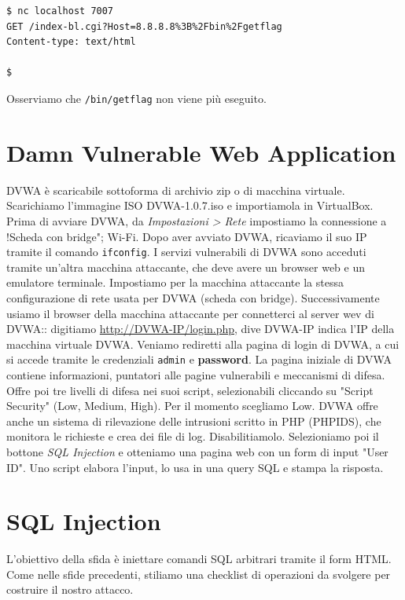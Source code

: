 \begin{mdframed}[backgroundcolor=white!20,shadow=false]
\begin{lstlisting}
$ nc localhost 7007
GET /index-bl.cgi?Host=8.8.8.8%3B%2Fbin%2Fgetflag
Content-type: text/html

$
\end{lstlisting}
\end{mdframed}
Osserviamo che \texttt{/bin/getflag} non viene più eseguito.


\section{Damn Vulnerable Web Application}
DVWA è scaricabile sottoforma di archivio zip o di macchina virtuale. Scarichiamo l'immagine ISO DVWA-1.0.7.iso e importiamola in VirtualBox. Prima di avviare DVWA, da \textit{Impostazioni > Rete} impostiamo la connessione a !Scheda con bridge"; Wi-Fi. Dopo aver avviato DVWA, ricaviamo il suo IP tramite il comando \texttt{ifconfig}. I servizi vulnerabili di DVWA sono acceduti tramite un'altra macchina attaccante, che deve avere un browser web e un emulatore terminale. Impostiamo per la macchina attaccante la stessa configurazione di rete usata per DVWA (scheda con bridge). Successivamente usiamo il browser della macchina attaccante per connetterci al server wev di DVWA:: digitiamo \href{http://DVWA-IP/login.php}{http://DVWA-IP/login.php}, dive DVWA-IP indica l'IP della macchina virtuale DVWA. Veniamo rediretti alla pagina di login di DVWA, a cui si accede tramite le credenziali \texttt{admin} e \textbf{password}. La pagina iniziale di DVWA contiene informazioni, puntatori alle pagine vulnerabili e meccanismi di difesa. Offre poi tre livelli di difesa nei suoi script, selezionabili cliccando su "Script Security" (Low, Medium, High). Per il momento scegliamo Low. DVWA offre anche un sistema di rilevazione delle intrusioni scritto in PHP (PHPIDS), che monitora le richieste e crea dei file di log. Disabilitiamolo. Selezioniamo poi il bottone \textit{SQL Injection} e otteniamo una pagina web con un form di input "User ID". Uno script elabora l'input, lo usa in una query SQL e stampa la risposta. 

\section{SQL Injection}

L'obiettivo della sfida è iniettare comandi SQL arbitrari tramite il form HTML. Come nelle sfide precedenti, stiliamo una checklist di operazioni da svolgere per costruire il nostro attacco. 

